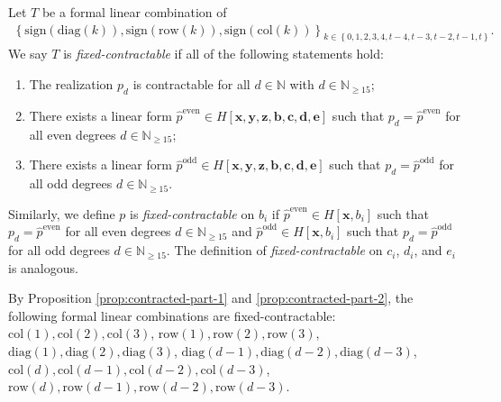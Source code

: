\begin{definition}
    Let \( T \) be a formal linear combination of
    \begin{align*}
        \left\{ \mathrm{sign}(\mathrm{diag}(k)), \mathrm{sign}(\mathrm{row}(k)), \mathrm{sign}(\mathrm{col}(k)) \right\}_{k \in \left\{ 0,1,2,3,4,t-4,t-3,t-2,t-1,t \right\}}.
    \end{align*}
    We say \( T \) is \emph{fixed-contractable} if all of the following statements hold:
    \begin{enumerate}
        \item The realization \( p_d \) is contractable for all \( d \in \mathbb{N} \) with \( d \in \mathbb{N}_{\geq 15} \);
        \item There exists a linear form \( \hat p^{\mathrm{even}} \in H[\mathbf{x}, \mathbf{y}, \mathbf{z}, \mathbf{b}, \mathbf{c}, \mathbf{d}, \mathbf{e}] \) such that \( p_d = \hat p^{\mathrm{even}} \) for all even degrees \(  d \in \mathbb{N}_{\geq 15}  \);
        \item There exists a linear form \( \hat p^{\mathrm{odd}} \in H[\mathbf{x}, \mathbf{y}, \mathbf{z}, \mathbf{b}, \mathbf{c}, \mathbf{d}, \mathbf{e}] \) such that \( p_d = \hat p^{\mathrm{odd}} \) for all odd degrees \(  d \in \mathbb{N}_{\geq 15}  \).
    \end{enumerate}
    
    Similarly, we define \( p \) is \emph{fixed-contractable} on \( b_i \) if \( \hat p^{\mathrm{even}} \in H[\mathbf{x}, b_i] \) such that \( p_d = \hat p^{\mathrm{even}} \) for all even degrees \(  d \in \mathbb{N}_{\geq 15}  \) and \( \hat p^{\mathrm{odd}} \in H[\mathbf{x}, b_i] \) such that \( p_d = \hat p^{\mathrm{odd}} \) for all odd degrees \(  d \in \mathbb{N}_{\geq 15}  \). The definition of \emph{fixed-contractable} on \( c_i \), \( d_i \), and \( e_i \) is analogous.
\end{definition}

\begin{example}
    By Proposition \ref{prop:contracted-part-1} and \ref{prop:contracted-part-2}, the following formal linear combinations are fixed-contractable: \( \mathrm{col}(1), \mathrm{col}(2), \mathrm{col}(3) \), \(  \mathrm{row}(1), \mathrm{row}(2), \mathrm{row}(3) \), \( \mathrm{diag}(1), \mathrm{diag}(2), \mathrm{diag}(3) \), \( \mathrm{diag}(d-1), \mathrm{diag}(d-2), \mathrm{diag}(d-3) \), \( \mathrm{col}(d), \mathrm{col}(d-1), \mathrm{col}(d-2), \mathrm{col}(d-3) \), \( \mathrm{row}(d), \mathrm{row}(d-1), \mathrm{row}(d-2), \mathrm{row}(d-3) \).
\end{example}

